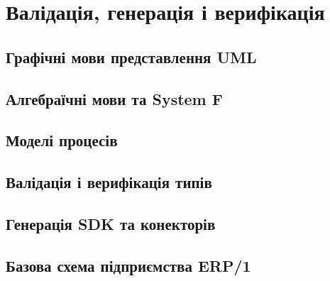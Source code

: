 \chapter{Валідація, генерація і верифікація}

\section{Графічні мови представлення UML}

\section{Алгебраїчні мови та System F}

\section{Моделі процесів}

\section{Валідація і верифікація типів}

\section{Генерація SDK та конекторів}

\section{Базова схема підприємства ERP/1}

